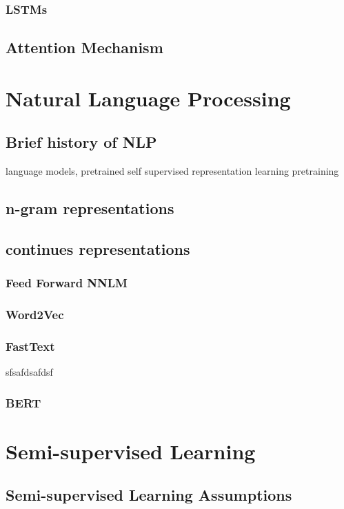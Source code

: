 \documentclass[12pt]{article}
\theoremstyle{definition}
\DeclareRobustCommand{\[}{\begin{equation}}
\DeclareRobustCommand{\]}{\end{equation}}
\begin{document}
        \subsubsection{LSTMs}
    \subsection{Attention Mechanism}

\section{Natural Language Processing}
    \subsection{Brief history of NLP}
    language models, pretrained self supervised representation learning
    pretraining
    \subsection{n-gram representations}
    \subsection{continues representations}
        \subsubsection{Feed Forward NNLM}
        \subsubsection{Word2Vec}
        \subsubsection{FastText}
        sfsafdsafdsf
        
        \subsubsection{BERT}
        
\section{Semi-supervised Learning}
        \subsection{Semi-supervised Learning Assumptions}
\end{document}
